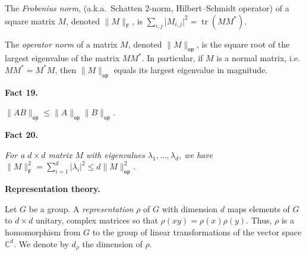 The \emph{Frobenius norm}, (a.k.a. Schatten 2-norm, Hilbert–Schmidt operator) of a square matrix $M$, denoted $\lVert M\rVert_{\mathsf{F}}$, is $\sum_{i,j}\lvert M_{i,j}\rvert^{2}=\operatorname{tr}(MM^{*})$.\par




The \emph{operator norm} of a matrix $M$, denoted $\lVert M\rVert_{\mathsf{op}}$, is the square root of the largest eigenvalue of the matrix $MM^{\ast}$.
In particular, if $M$ is a normal matrix, i.e. $MM^{\ast}=M^{\ast}M$, then $\lVert M\rVert_{\mathsf{op}}$ equals its largest eigenvalue in magnitude.\par





\par\medskip\noindent\textbf{
\textbf{Fact 19}\textbf{.}
}\par



$\lVert AB\rVert_{\mathsf{op}}\leq\lVert A\rVert_{\mathsf{op}}\lVert B\rVert_{\mathsf{op}}$\emph{.}\par







\par\medskip\noindent\textbf{
\textbf{Fact 20}\textbf{.}
}\par



\emph{For a $d\times d$ matrix $M$ with eigenvalues $\lambda_{1},\ldots,\lambda_{d}$, we have $\lVert M\rVert_{\mathsf{F}}^{2}=\sum_{i=1}^{d}\lvert\lambda_{i}\rvert^{2}\leq d\lVert M\rVert_{\mathsf{op}}^{2}$.}\par







\par\medskip\noindent\textbf{Representation theory.}\par




Let $G$ be a group. A \emph{representation }$\rho$ of $G$ with
dimension $d$ maps elements of $G$ to $d\times d$ unitary, complex
matrices so that $\rho(xy)=\rho(x)\rho(y)$. Thus, $\rho$ is a homomorphism
from $G$ to the group of linear transformations of the vector space
$\mathbb{C}^{d}$. We denote by $d_{\rho}$ the dimension of $\rho$.\par




